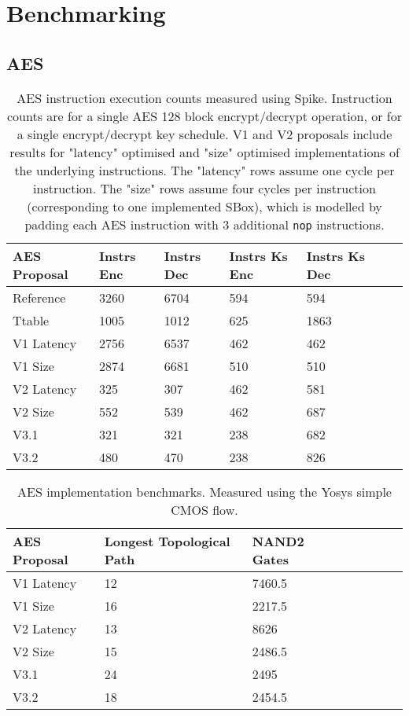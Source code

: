 
\section{Benchmarking}

\subsection{AES}
\label{sec:benchmark:aes}

\begin{table}[h]
\centering
\begin{tabular}{lllllll}
AES Proposal & Instrs Enc & Instrs Dec & Instrs Ks Enc & Instrs Ks Dec \\ \hline
Reference   & 3260  & 6704  & 594  &  594    \\
Ttable      & 1005  & 1012  & 625  &  1863   \\
V1 Latency  & 2756  & 6537  & 462  &  462    \\
V1 Size     & 2874  & 6681  & 510  &  510    \\
V2 Latency  & 325   & 307   & 462  &  581    \\
V2 Size     & 552   & 539   & 462  &  687    \\
V3.1        & 321   & 321   & 238  &  682    \\
V3.2        & 480   & 470   & 238  &  826    \\
\end{tabular}
\caption{
AES instruction execution counts measured using Spike.
Instruction counts are for a single AES 128 block encrypt/decrypt operation,
or for a single encrypt/decrypt key schedule.
V1 and V2 proposals include results for "latency" optimised and "size"
optimised implementations of the underlying instructions.
The "latency" rows assume one cycle per instruction.
The "size" rows assume four cycles per instruction (corresponding to
one implemented SBox), which is modelled by padding each AES instruction
with 3 additional {\tt nop} instructions.
}
\label{tab:benchmarks:aes:perf}
\end{table}


\begin{table}[h]
\centering
\begin{tabular}{llllllll}
AES Proposal & Longest Topological Path & NAND2 Gates   \\ \hline
V1 Latency   & 12                       & 7460.5        \\
V1 Size      & 16                       & 2217.5        \\
V2 Latency   & 13                       & 8626          \\
V2 Size      & 15                       & 2486.5        \\
V3.1         & 24                       & 2495          \\
V3.2         & 18                       & 2454.5        \\
\end{tabular}
\caption{
AES implementation benchmarks.
Measured using the Yosys simple CMOS flow.
}
\label{tab:benchmarks:aes:impl}
\end{table}


